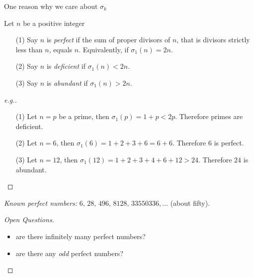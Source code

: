 
One reason why we care about $\sigma_k$

\vspace*{0.5em}

\begin{definition}
Let $n$ be a positive integer
\begin{itemize}
\item[(1)] Say $n$ is \emph{perfect} if the sum of proper divisors of $n$, that is divisors strictly less than $n$, equals $n$. Equivalently, if $\sigma_1(n) = 2n$.
\item[(2)] Say $n$ is \emph{deficient} if $\sigma_1(n) < 2n$.
\item[(3)] Say $n$ is \emph{abundant} if $\sigma_1(n) > 2n$.
\end{itemize}
\vspace*{0.5em}
\begin{proof}[e.g.]\renewcommand{\qedsymbol}{}
\begin{itemize}
\item[(1)] Let $n = p$ be a prime, then $\sigma_1(p) = 1 + p < 2p$. Therefore primes are deficient.
\end{itemize}
\begin{itemize}[leftmargin=4.4em]
\item[(2)] Let $n = 6$, then $\sigma_1(6) = 1 + 2 + 3 + 6 = 6 + 6$. Therefore $6$ is perfect.
\item[(3)] Let $n = 12$, then $\sigma_1(12) = 1 + 2 + 3 + 4 + 6 + 12 > 24$. Therefore $24$ is abundant.
\end{itemize}
\end{proof}
\end{definition}

\vspace*{-1em}

\emph{Known perfect numbers:} $6,\,28,\,496,\,8128,\,33550336,\ldots$ (about fifty).

\vspace*{1em}

\begin{proof}[Open Questions]\renewcommand{\qedsymbol}{}
\hfill
\begin{itemize}
\item are there infinitely many perfect numbers?
\item are there any \emph{odd} perfect numbers?
\end{itemize}
\end{proof}

